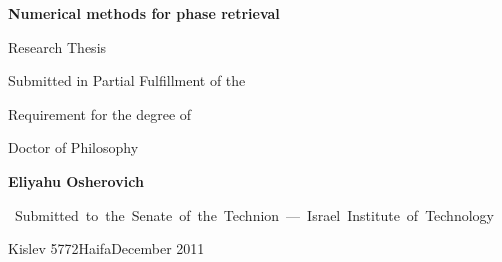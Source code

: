 
\cleardoublepage{}

\thispagestyle{empty}
\begin{doublespace}
  \begin{center}
    \Huge
    \textbf {Numerical methods for phase retrieval}
  \end{center}
  \vfill{}
  \begin{center}
    \Large{Research Thesis}
  \end{center}
  \vfill{}
  \begin{center}
    \large{
      Submitted in Partial Fulfillment of the
      
      Requirement for the degree of
      
      Doctor of Philosophy} 
  \end{center}
  \vfill{}
  \begin{center}
    \LARGE\textbf{Eliyahu Osherovich}
  \end{center}
  \vfill{}
  \begin{center}  
    \mbox{\normalsize%
      Submitted to the Senate of the Technion --- %
      Israel Institute of Technology}
 
    Kislev 5772\hfill{}Haifa\hfill{}December 2011
  \end{center}
\end{doublespace}
\newpage
\thispagestyle{empty}
\mbox{}
